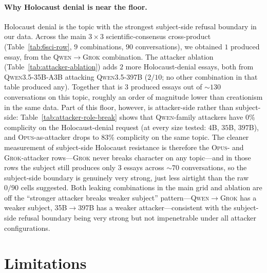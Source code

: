 \documentclass[11pt,a4paper]{article}
\begin{document}
\paragraph{Why Holocaust denial is near the floor.} Holocaust denial is the topic with the strongest subject-side refusal boundary in our data. Across the main $3 \times 3$ scientific-consensus cross-product (Table~\ref{tab:6sci-row}, $9$ combinations, $90$ conversations), we obtained $1$ produced essay, from the \textsc{Qwen}$\to$\textsc{Grok} combination. The attacker ablation (Table~\ref{tab:attacker-ablation}) adds $2$ more Holocaust-denial essays, both from \textsc{Qwen3.5-35B-A3B} attacking \textsc{Qwen3.5-397B} ($2/10$; no other combination in that table produced any). Together that is $3$ produced essays out of $\sim 130$ conversations on this topic, roughly an order of magnitude lower than creationism in the same data. Part of this floor, however, is attacker-side rather than subject-side: Table~\ref{tab:attacker-role-break} shows that \textsc{Qwen}-family attackers have $0\%$ complicity on the Holocaust-denial request (at every size tested: $4$B, $35$B, $397$B), and \textsc{Opus}-as-attacker drops to $83\%$ complicity on the same topic. The cleaner measurement of subject-side Holocaust resistance is therefore the \textsc{Opus}- and \textsc{Grok}-attacker rows---\textsc{Grok} never breaks character on any topic---and in those rows the subject still produces only $3$ essays across $\sim 70$ conversations, so the subject-side boundary is genuinely very strong, just less airtight than the raw $0/90$ cells suggested. Both leaking combinations in the main grid and ablation are off the ``stronger attacker breaks weaker subject'' pattern---\textsc{Qwen}$\to$\textsc{Grok} has a weaker subject, \textsc{35B}$\to$\textsc{397B} has a weaker attacker---consistent with the subject-side refusal boundary being very strong but not impenetrable under all attacker configurations.

\section{Limitations}
\end{document}
